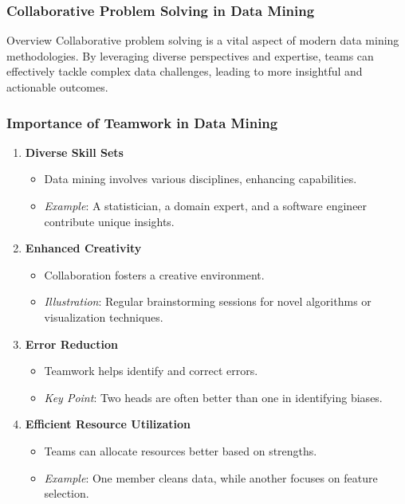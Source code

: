 \documentclass{beamer}
\begin{document}
\begin{frame}[fragile]
    \frametitle{Collaborative Problem Solving in Data Mining}
    \begin{block}{Overview}
        Collaborative problem solving is a vital aspect of modern data mining methodologies. By leveraging diverse perspectives and expertise, teams can effectively tackle complex data challenges, leading to more insightful and actionable outcomes.
    \end{block}
\end{frame}

\begin{frame}[fragile]
    \frametitle{Importance of Teamwork in Data Mining}
    \begin{enumerate}
        \item \textbf{Diverse Skill Sets}
            \begin{itemize}
                \item Data mining involves various disciplines, enhancing capabilities.
                \item \textit{Example}: A statistician, a domain expert, and a software engineer contribute unique insights.
            \end{itemize}
        \item \textbf{Enhanced Creativity}
            \begin{itemize}
                \item Collaboration fosters a creative environment.
                \item \textit{Illustration}: Regular brainstorming sessions for novel algorithms or visualization techniques.
            \end{itemize}
        \item \textbf{Error Reduction}
            \begin{itemize}
                \item Teamwork helps identify and correct errors.
                \item \textit{Key Point}: Two heads are often better than one in identifying biases.
            \end{itemize}
        \item \textbf{Efficient Resource Utilization}
            \begin{itemize}
                \item Teams can allocate resources better based on strengths.
                \item \textit{Example}: One member cleans data, while another focuses on feature selection.
            \end{itemize}
    \end{enumerate}
\end{frame}
\end{document}

